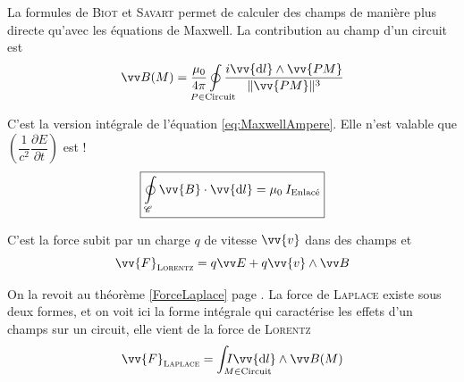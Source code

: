 \documentclass[11pt,a4paper,fleqn,pdftex]{report}
\begin{document}
\begin{theorem}
La formules de \textsc{Biot} et \textsc{Savart}  permet de calculer des champs \B{} de manière plus directe qu'avec les équations de Maxwell. La contribution au champ \B{} d'un circuit est 
\begin{equation}\label{BiotSavart}
\B{}(M) = \dfrac{\mu_0}{4\pi} \oint \limits_{\mathclap{P\in \text{Circuit}}} \dfrac{i \vv{\d{}l} \wedge \vv{PM}}{\| \vv{PM} \| ^{3}}
\end{equation}
\end{theorem}
%
\needspace{5cm}
\begin{itheorem}
C'est la version intégrale de l'équation \eqref{eq:MaxwellAmpere}. \Attention Elle n'est valable que $\left( \dfrac{1}{c^2}\dfrac{\partial E}{\partial t} \right)
$ est  !
\begin{equation}\label{MaxwellAmpere}
\boxed{\oint \limits_\mathscr{C} \vv{B}\cdot \vv{\d l}= \mu_0 \: I_\text{Enlacé}}
\end{equation}
\end{itheorem}
%
\begin{dfn}
C'est la force subit par un charge $q$ de vitesse $\vv{v}$ dans des champs \E{} et \B{}
\begin{equation}\label{ForceLorentz}
\vv{F}_\text{\textsc{Lorentz}} = q\E + q \vv{v}\wedge \B
\end{equation}
\end{dfn}
%
\begin{theorem}
On la revoit au théorème \ref{ForceLaplace} page \pageref{ForceLaplace}.\newline
La force de \textsc{Laplace} existe sous deux formes, et on voit ici la forme intégrale qui caractérise les effets d'un champs \B{} sur un circuit, elle vient de la force de \textsc{Lorentz} 
\begin{equation}
\vv{F}_\text{\textsc{Laplace}}=\int_{\mathrlap{M\in \text{Circuit}}} I \vv{\d{}l} \wedge \B{}(M)
\end{equation}
\end{theorem}
\end{document}
